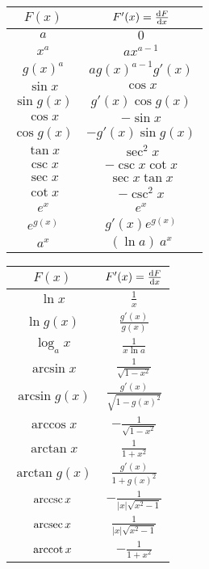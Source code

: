\begin{center}
     \begin{tabular}{|c|c|}
        \hline
    $F(x)$ & $F'(x)=\diff{F}{x}$ \\ 
        \hline\hline
    $a$ & $0$ \\  \hline
    $x^a$ & $ax^{a-1}$ \\  \hline
    $g(x)^a$ & $ag(x)^{a-1}g'(x)$ \\  \hline\hline
    $\sin x$ & $\cos x$ \\  \hline
    $\sin g(x)$ & $g'(x)\cos g(x)$ \\  \hline
    $\cos x$ & $-\sin x$ \\  \hline
    $\cos g(x)$ & $-g'(x)\sin g(x)$ \\  \hline
    $\tan x$ & $\sec^2 x$ \\  \hline
    $\csc x$ & $-\csc x\cot x$ \\  \hline
    $\sec x$ & $\sec x\tan x$ \\  \hline
    $\cot x$ & $-\csc^2 x$ \\  \hline\hline
    $e^x$ & $e^x$ \\  \hline
    $e^{g(x)}$ & $g'(x)e^{g(x)}$ \\  \hline
    $a^x$ & $(\ln a)\ a^x$ \\  \hline\hline
     \end{tabular}\qquad\qquad
     \begin{tabular}{|c|c|}
        \hline
    $F(x)$ & $F'(x)=\diff{F}{x}$ \\ 
        \hline\hline
    $\ln x$ & $\frac{1}{x}$ \\  \hline
    $\ln g(x)$ & $\frac{g'(x)}{g(x)}$ \\  \hline
    $\log_a x$ & $\frac{1}{x\ln a}$ \\  \hline\hline
    $\arcsin x$ & $\frac{1}{\sqrt{1-x^2}}$ \\  \hline
    $\arcsin g(x)$ & $\frac{g'(x)}{\sqrt{1-g(x)^2}}$ \\  \hline
    $\arccos x$ & $-\frac{1}{\sqrt{1-x^2}}$ \\  \hline
    $\arctan x$ & $\frac{1}{1+x^2}$ \\  \hline
    $\arctan g(x)$ & $\frac{g'(x)}{1+g(x)^2}$ \\  \hline
    $\mathop{\mathrm{arccsc}} x$ & $-\frac{1}{|x|\sqrt{x^2-1}}$ \\  \hline
    $\mathop{\mathrm{arcsec}} x$ & $\frac{1}{|x|\sqrt{x^2-1}}$ \\  \hline
    $\mathop{\mathrm{arccot}} x$ & $-\frac{1}{1+x^2}$ \\  \hline
     \end{tabular}
\renewcommand{\arraystretch}{1.0}

\end{center}



